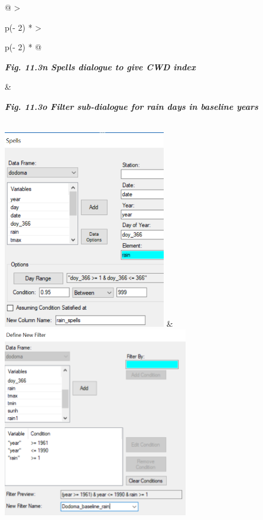 \documentclass[
  letterpaper,
  DIV=11,
  numbers=noendperiod]{scrreprt}
\begin{document}
\begin{longtable}[]{@{}
  >{\raggedright\arraybackslash}p{(\columnwidth - 2\tabcolsep) * }
  >{\raggedright\arraybackslash}p{(\columnwidth - 2\tabcolsep) * }@{}}
\toprule\noalign{}
\begin{minipage}[b]{\linewidth}\raggedright
\textbf{\emph{Fig. 11.3n Spells dialogue to give CWD index}}
\end{minipage} & \begin{minipage}[b]{\linewidth}\raggedright
\textbf{\emph{Fig. 11.3o Filter sub-dialogue for rain days in baseline
years}}
\end{minipage} \\
\midrule\noalign{}
\endhead
\bottomrule\noalign{}
\endlastfoot
\includegraphics[width=2.80286in,height=3.43011in]{figures/Fig11.3n.png}
&
\includegraphics[width=3.18575in,height=3.27396in]{figures/Fig11.3o.png} \\
\end{longtable}
\end{document}
